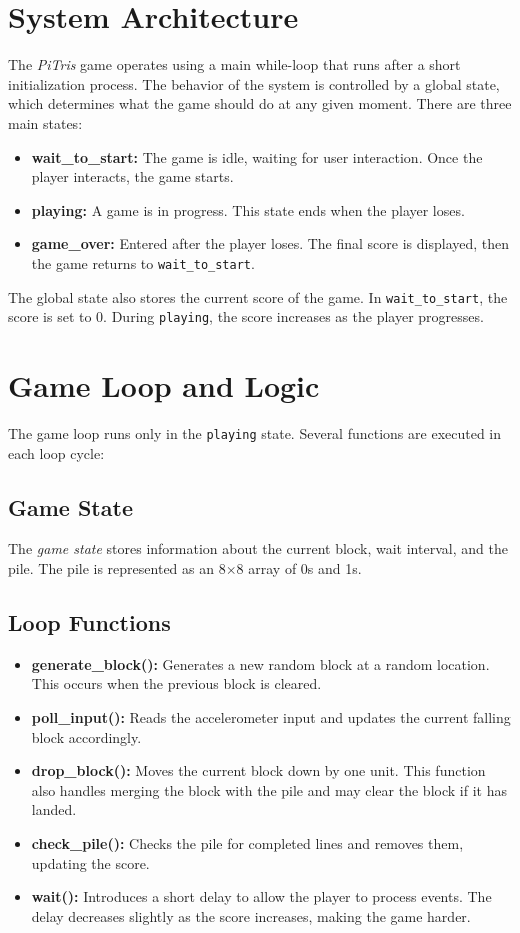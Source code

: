 \documentclass[11pt,titlepage,openright]{book}
\begin{document}
\section{System Architecture}
The \textit{PiTris} game operates using a main while-loop that runs after a short initialization process. The behavior of the system is controlled by a global state, which determines what the game should do at any given moment. There are three main states:

\begin{itemize}
    \item \textbf{wait\_to\_start:} The game is idle, waiting for user interaction. Once the player interacts, the game starts.
    \item \textbf{playing:} A game is in progress. This state ends when the player loses.
    \item \textbf{game\_over:} Entered after the player loses. The final score is displayed, then the game returns to \texttt{wait\_to\_start}.
\end{itemize}

The global state also stores the current score of the game. In \texttt{wait\_to\_start}, the score is set to 0. During \texttt{playing}, the score increases as the player progresses.

\section{Game Loop and Logic}
The game loop runs only in the \texttt{playing} state. Several functions are executed in each loop cycle:

\subsection{Game State}
The \textit{game state} stores information about the current block, wait interval, and the pile. The pile is represented as an 8$\times$8 array of 0s and 1s.  

\subsection{Loop Functions}
\begin{itemize}
    \item \textbf{generate\_block():} Generates a new random block at a random location. This occurs when the previous block is cleared.
    \item \textbf{poll\_input():} Reads the accelerometer input and updates the current falling block accordingly.
    \item \textbf{drop\_block():} Moves the current block down by one unit. This function also handles merging the block with the pile and may clear the block if it has landed.
    \item \textbf{check\_pile():} Checks the pile for completed lines and removes them, updating the score.
    \item \textbf{wait():} Introduces a short delay to allow the player to process events. The delay decreases slightly as the score increases, making the game harder.
\end{itemize}
\end{document}
